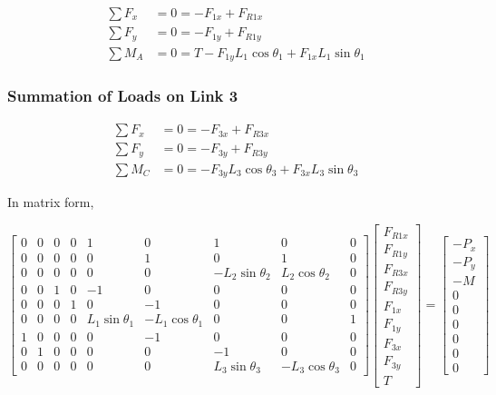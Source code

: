 \documentclass[letterpaper]{article}
\begin{document}
\begin{align}
	\sum F_x &= 0 = -F_{1x} + F_{R1x} \\
	\sum F_y &= 0 = -F_{1y} + F_{R1y} \\
	\sum M_A &= 0 = T - F_{1y} L_1 \cos \theta_1 + F_{1x} L_1 \sin \theta_1
\end{align}

\subsubsection{Summation of Loads on Link 3}

\begin{align}
	\sum F_x &= 0 = -F_{3x} + F_{R3x} \\
	\sum F_y &= 0 = -F_{3y} + F_{R3y} \\
	\sum M_C &= 0 = - F_{3y} L_3 \cos \theta_3 + F_{3x} L_3 \sin \theta_3
\end{align}

\noindent In matrix form,

\begin{equation}
\begin{bmatrix}
0 & 0 & 0 & 0 & 1 & 0 & 1 & 0 &0 \\ 
0 & 0 & 0 & 0 & 0 & 1 & 0 & 1 &0 \\
0 & 0 & 0 & 0 & 0 & 0 & -L_2 \sin \theta_2 & L_2 \cos \theta_2 & 0 \\
0 & 0 & 1 & 0 & -1 & 0 & 0 & 0 & 0 \\
0 & 0 & 0 & 1 & 0 & -1 & 0 & 0 & 0 \\
0 & 0 & 0 & 0 & L_1 \sin \theta_1 & -L_1 \cos \theta_1 & 0 & 0 & 1\\
1 & 0 & 0 & 0 & 0 & -1 & 0 & 0 & 0 \\
0 & 1 & 0 & 0 & 0 & 0 & -1 & 0 & 0 \\
0 & 0 & 0 & 0 & 0 & 0 & L_3 \sin \theta_3 & -L_3 \cos \theta_3 & 0
\end{bmatrix}
\begin{bmatrix} F_{R1x} \\ F_{R1y} \\ F_{R3x} \\ F_{R3y} \\ F_{1x} \\ F_{1y} \\ F_{3x} \\ F_{3y} \\ T \end{bmatrix}
=
\begin{bmatrix} -P_x \\ - P_y \\ -M \\ 0 \\ 0 \\ 0 \\ 0 \\ 0 \\ 0 \end{bmatrix}
\end{equation}
\end{document}
